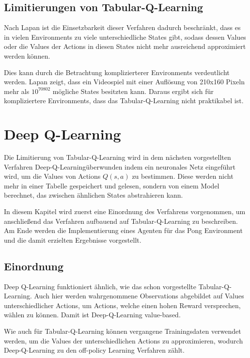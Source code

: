 \documentclass[11pt]{scrartcl}
\begin{document}
\subsection{Limitierungen von Tabular-Q-Learning}
Nach Lapan\cite[~S.192]{L2018} ist die Einsetzbarkeit dieser Verfahren dadurch
beschränkt, dass es in vielen Environments zu viele unterschiedliche States gibt, sodass
dessen Values oder die Values der Actions in diesen States nicht mehr ausreichend
approximiert werden können.

Dies kann durch die Betrachtung komplizierterer Environments verdeutlicht werden. Lapan
\cite[~S.192]{L2018} zeigt, dass ein Videospiel mit einer Auflösung von 210x160 Pixeln
mehr als $10^{70802}$ mögliche States besitzten kann. Daraus ergibt sich für
kompliziertere Environments, dass das Tabular-Q-Learning nicht praktikabel ist.

\newpage
\section{Deep Q-Learning}
\label{sec:dqn}
Die Limitierung von Tabular-Q-Learning wird in dem nächsten vorgestellten Verfahren \grqq
Deep-Q-Learning\grqq überwunden indem ein neuronales Netz eingeführt wird, um die Values
von Actions $Q(s, a)$ zu bestimmen. Diese werden nicht mehr in einer Tabelle gespeichert
und gelesen, sondern von einem Model berechnet, das zwischen ähnlichen States
abstrahieren kann.

In diesem Kapitel wird zuerst eine Einordnung des Verfahrens vorgenommen, um anschließend
das Verfahren aufbauend auf Tabular-Q-Learning zu beschreiben. Am Ende werden die	
Implementierung eines Agenten für das Pong Environment und die damit erzielten Ergebnisse
vorgestellt.

\subsection{Einordnung}
Deep Q-Learning funktioniert ähnlich, wie das schon vorgestellte Tabular-Q-Learning. Auch
hier werden wahrgenommene Observations abgebildet auf Values unterschiedlicher Actions, um
Actions, welche einen hohen Reward versprechen, wählen zu können. Damit ist
Deep-Q-Learning value-based.

Wie auch für Tabular-Q-Learning können vergangene Trainingsdaten verwendet werden, um die
Values der unterschiedlichen Actions zu approximieren, wodurch Deep-Q-Learning zu den
off-policy Learning Verfahren zählt.
\end{document}
